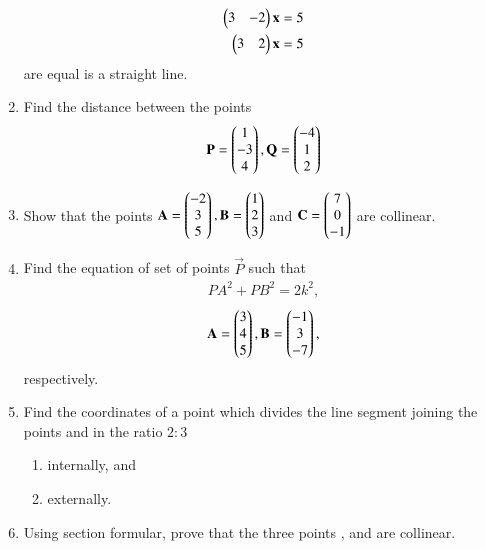 \begin{enumerate}[label=\arabic*.,ref=\thesubsection.\theenumi]
%
\begin{align}
\begin{pmatrix}3 & -2\end{pmatrix}\mathbf{x}  &= 5
\\
\begin{pmatrix}3 & 2\end{pmatrix}\mathbf{x}  &= 5
\end{align}
%
are  equal is a straight line.
%
\item Find the distance between the points
%
\begin{align}
\mathbf{P} = \begin{pmatrix}1\\-3\\4\end{pmatrix},
\mathbf{Q} = \begin{pmatrix}-4\\1\\2\end{pmatrix}
\end{align}
%
\item Show that the points 
$
\mathbf{A}=\begin{pmatrix}-2\\3\\5\end{pmatrix}, 
\mathbf{B}=\begin{pmatrix}1\\2\\3\end{pmatrix}$ 
and 
$ \mathbf{C}=\begin{pmatrix}7\\0\\-1\end{pmatrix}$ 
are collinear.
%
\item Find the equation of set of points $\vec{P}$ such that
\begin{align}
PA^2+PB^2 =2k^2,
\end{align}
%
\begin{align}
\mathbf{A} = \begin{pmatrix}3\\4 \\5\end{pmatrix},
\mathbf{B} = \begin{pmatrix}-1\\3 \\-7\end{pmatrix},
\end{align}
%
respectively.
%
\item Find the coordinates of a point which divides the line segment joining the points  and  in the ratio $2:3$
\begin{enumerate}
\item internally, and
\item externally.
\end{enumerate}
%
\item Using section formular, prove that the three points ,  and  are collinear.

\end{enumerate}
